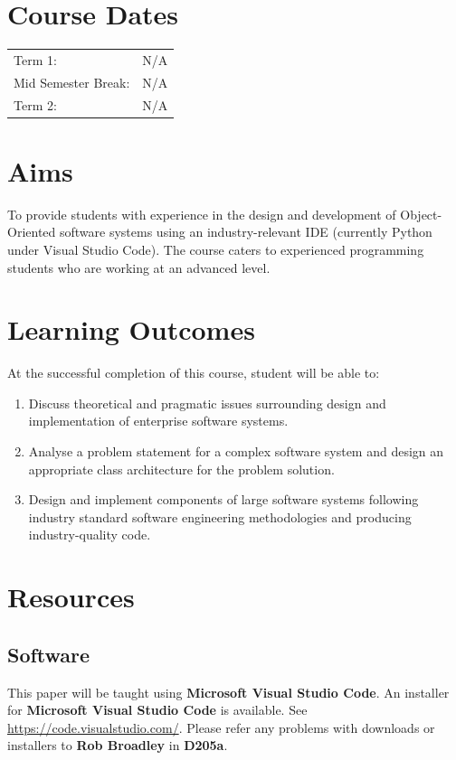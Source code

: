 \documentclass{article}
\begin{document}
\section*{Course Dates}
\begin{tabular}{ll}
	Term 1:             & N/A \\
	Mid Semester Break: & N/A \\
	Term 2:             & N/A \\
\end{tabular}

\section*{Aims}
To provide students with experience in the design and development of Object-Oriented software systems using an industry-relevant IDE (currently Python under Visual Studio Code). The course caters to experienced programming students who are working at an advanced level.

\section*{Learning Outcomes}
At the successful completion of this course, student will be able to:
\begin{enumerate}
	\item Discuss theoretical and pragmatic issues surrounding design and implementation of enterprise software systems.
	\item Analyse a problem statement for a complex software system and design an appropriate class architecture for the problem solution.
	\item Design and implement components of large software systems following industry standard software engineering methodologies and producing industry-quality code.
\end{enumerate}

\section*{Resources}

\subsection*{Software}
This paper will be taught using \textbf{Microsoft Visual Studio Code}. An installer for \textbf{Microsoft Visual Studio Code} is available. See \href{https://code.visualstudio.com/}{https://code.visualstudio.com/}. Please refer any problems with downloads or installers to \textbf{Rob Broadley} in \textbf{D205a}.
\end{document}
